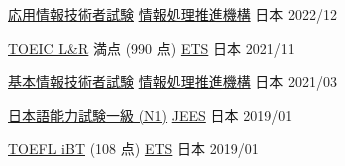 
\begin{cvhonors}

  \cvhonor
    {\href{https://www.ipa.go.jp/shiken/kubun/ap.html}{応用情報技術者試験}} %
    {\href{https://www.ipa.go.jp/index.html}{情報処理推進機構}} %
    {日本} %
    {2022/12} %

  \cvhonor
    {\href{https://www.iibc-global.org/toeic.html}{TOEIC L\&R} 満点 (990 点)} %
    {\href{https://www.ets.org/}{ETS}} %
    {日本} %
    {2021/11} %

  \cvhonor
    {\href{https://www.ipa.go.jp/shiken/kubun/fe.html}{基本情報技術者試験}} %
    {\href{https://www.ipa.go.jp/index.html}{情報処理推進機構}} %
    {日本} %
    {2021/03} %

  \cvhonor
    {\href{https://www.jlpt.jp/}{日本語能力試験一級 (N1)}} %
    {\href{http://www.jees.or.jp/}{JEES}} %
    {日本} %
    {2019/01} %

  \cvhonor
    {\href{https://www.ets.org/toefl.html}{TOEFL iBT} (108 点)} %
    {\href{https://www.ets.org/}{ETS}}%
    {日本} %
    {2019/01} %
\end{cvhonors}
